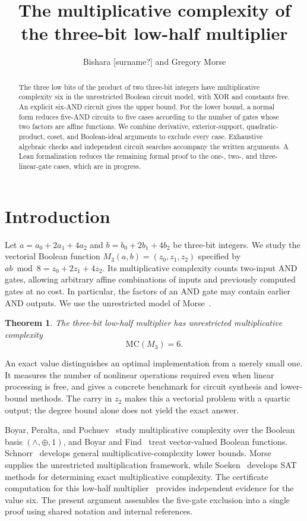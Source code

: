\documentclass[11pt,a4paper]{article}
\title{The multiplicative complexity of the three-bit low-half multiplier}
\author{Bishara [surname?] and Gregory Morse}
\date{}
\theoremstyle{plain}
\newtheorem{theorem}{Theorem}
\theoremstyle{remark}
\begin{document}
\maketitle
\begin{abstract}
The three low bits of the product of two three-bit integers have multiplicative complexity six in the unrestricted Boolean circuit model, with XOR and constants free. An explicit six-AND circuit gives the upper bound. For the lower bound, a normal form reduces five-AND circuits to five cases according to the number of gates whose two factors are affine functions. We combine derivative, exterior-support, quadratic-product, coset, and Boolean-ideal arguments to exclude every case. Exhaustive algebraic checks and independent circuit searches accompany the written arguments. A Lean formalization reduces the remaining formal proof to the one-, two-, and three-linear-gate cases, which are in progress.
\end{abstract}
\setcounter{tocdepth}{1}
\tableofcontents

\section{Introduction}\label{sec:introduction}
Let $a=a_0+2a_1+4a_2$ and $b=b_0+2b_1+4b_2$ be three-bit integers. We study the vectorial Boolean function $M_3(a,b)=(z_0,z_1,z_2)$ specified by $ab\bmod8=z_0+2z_1+4z_2$. Its multiplicative complexity counts two-input AND gates, allowing arbitrary affine combinations of inputs and previously computed gates at no cost. In particular, the factors of an AND gate may contain earlier AND outputs. We use the unrestricted model of Morse~\cite{morse}.

\begin{theorem}\label{thm:MC}
The three-bit low-half multiplier has unrestricted multiplicative complexity
\[
\mathrm{MC}(M_3)=6.
\]
\end{theorem}

An exact value distinguishes an optimal implementation from a merely small one. It measures the number of nonlinear operations required even when linear processing is free, and gives a concrete benchmark for circuit synthesis and lower-bound methods. The carry in $z_2$ makes this a vectorial problem with a quartic output; the degree bound alone does not yield the exact answer.

Boyar, Peralta, and Pochuev~\cite{bpp} study multiplicative complexity over the Boolean basis $(\wedge,\oplus,1)$, and Boyar and Find~\cite{bf} treat vector-valued Boolean functions. Schnorr~\cite{schnorr} develops general multiplicative-complexity lower bounds. Morse~\cite{morse} supplies the unrestricted multiplication framework, while Soeken~\cite{soeken} develops SAT methods for determining exact multiplicative complexity. The certificate computation for this low-half multiplier~\cite{cert} provides independent evidence for the value six. The present argument assembles the five-gate exclusion into a single proof using shared notation and internal references.
\end{document}
